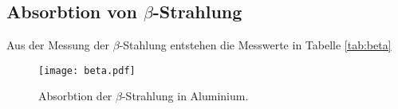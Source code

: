 \subsection{Absorbtion von \texorpdfstring{$\beta$}{Beta}-Strahlung}
Aus der Messung der $\beta$-Stahlung entstehen die Messwerte in Tabelle \ref{tab:beta}
\noindent
\begin{figure}[H]
  \centering
  \texttt{[image: beta.pdf]}
  \caption{Absorbtion der $\beta$-Strahlung in Aluminium.}
  \label{fig:beta}
\end{figure}
\noindent
